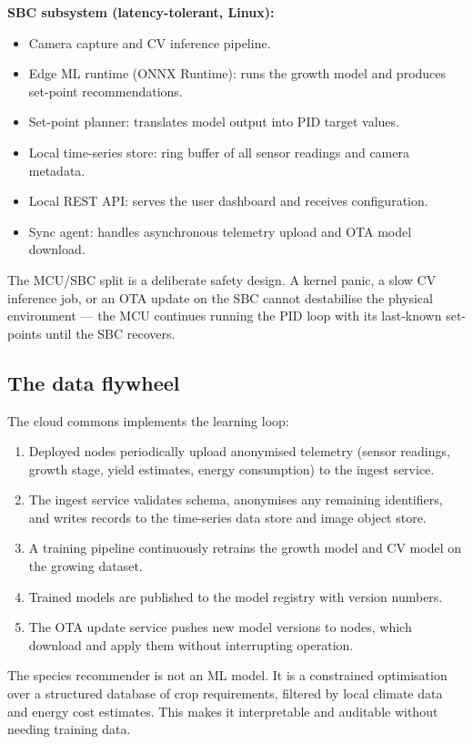 \textbf{SBC subsystem (latency-tolerant, Linux):}
\begin{itemize}
  \item Camera capture and CV inference pipeline.
  \item Edge ML runtime (ONNX Runtime): runs the growth model and produces set-point recommendations.
  \item Set-point planner: translates model output into PID target values.
  \item Local time-series store: ring buffer of all sensor readings and camera metadata.
  \item Local REST API: serves the user dashboard and receives configuration.
  \item Sync agent: handles asynchronous telemetry upload and OTA model download.
\end{itemize}

The MCU/SBC split is a deliberate safety design. A kernel panic, a slow CV inference job, or an OTA update on the SBC cannot destabilise the physical environment --- the MCU continues running the PID loop with its last-known set-points until the SBC recovers.

\subsection{The data flywheel}

The cloud commons implements the learning loop:

\begin{enumerate}
  \item Deployed nodes periodically upload anonymised telemetry (sensor readings, growth stage, yield estimates, energy consumption) to the ingest service.
  \item The ingest service validates schema, anonymises any remaining identifiers, and writes records to the time-series data store and image object store.
  \item A training pipeline continuously retrains the growth model and CV model on the growing dataset.
  \item Trained models are published to the model registry with version numbers.
  \item The OTA update service pushes new model versions to nodes, which download and apply them without interrupting operation.
\end{enumerate}

The species recommender is not an ML model. It is a constrained optimisation over a structured database of crop requirements, filtered by local climate data and energy cost estimates. This makes it interpretable and auditable without needing training data.

